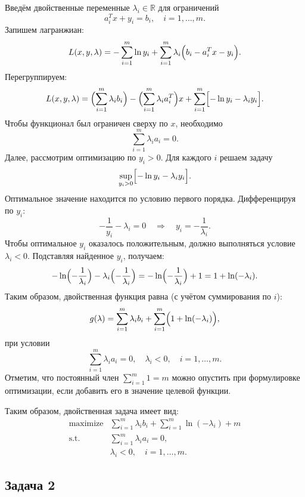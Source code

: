 \documentclass[a4paper,12pt]{article}
\begin{document}
	Введём двойственные переменные $\lambda_i\in\mathbb{R}$ для ограничений
	\[
	a_i^T x + y_i = b_i,\quad i=1,\dots,m.
	\]
	Запишем лагранжиан:
	\[
	L(x,y,\lambda)= -\sum_{i=1}^{m}\ln y_i + \sum_{i=1}^{m}\lambda_i\Bigl(b_i-a_i^T x-y_i\Bigr).
	\]
	Перегруппируем:
	\[
	L(x,y,\lambda)= \Bigl(\sum_{i=1}^{m}\lambda_i b_i\Bigr) - \Bigl(\sum_{i=1}^{m}\lambda_i a_i^T\Bigr)x + \sum_{i=1}^{m}\Bigl[-\ln y_i-\lambda_i y_i\Bigr].
	\]
	Чтобы функционал был ограничен сверху по $x$, необходимо
	\[
	\sum_{i=1}^{m}\lambda_i a_i = 0.
	\]
	Далее, рассмотрим оптимизацию по $y_i>0$. Для каждого $i$ решаем задачу
	\[
	\sup_{y_i>0}\Bigl[-\ln y_i-\lambda_i y_i\Bigr].
	\]
	Оптимальное значение находится по условию первого порядка. Дифференцируя по $y_i$:
	\[
	-\frac{1}{y_i}-\lambda_i=0 \quad\Longrightarrow\quad y_i=-\frac{1}{\lambda_i}.
	\]
	Чтобы оптимальное $y_i$ оказалось положительным, должно выполняться условие $\lambda_i<0$. Подставляя найденное $y_i$, получаем:
	\[
	-\ln\Bigl(-\frac{1}{\lambda_i}\Bigr)-\lambda_i\Bigl(-\frac{1}{\lambda_i}\Bigr)
	= -\ln\Bigl(-\frac{1}{\lambda_i}\Bigr)+1 = 1+\ln(-\lambda_i).
	\]
	Таким образом, двойственная функция равна (с учётом суммирования по $i$):
	\[
	g(\lambda)= \sum_{i=1}^{m}\lambda_i b_i + \sum_{i=1}^{m}\Bigl(1+\ln(-\lambda_i)\Bigr),
	\]
	при условии
	\[
	\sum_{i=1}^{m}\lambda_i a_i =0,\quad \lambda_i<0,\quad i=1,\dots,m.
	\]
	Отметим, что постоянный член $\sum_{i=1}^{m}1=m$ можно опустить при формулировке оптимизации, если добавить его в значение целевой функции.
	
	\medskip
	
	Таким образом, двойственная задача имеет вид:
	\[
	\begin{array}{rl}
		\text{maximize} & \displaystyle \sum_{i=1}^{m}\lambda_i b_i + \sum_{i=1}^{m}\ln(-\lambda_i) + m\\[2mm]
		\text{s.t.} & \displaystyle \sum_{i=1}^{m}\lambda_i a_i =0,\\[1mm]
		& \lambda_i<0,\quad i=1,\dots,m.
	\end{array}
	\]
	
	\bigskip
	
	\subsection*{Задача 2}

	
	\medskip
	
\end{document}

